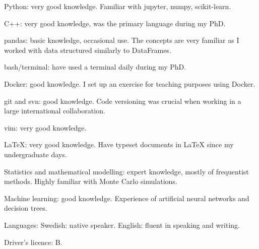 



\begin{cvskills}


\cvskill
{Python:}
{very good knowledge. Familiar with jupyter, numpy, scikit-learn.}

\cvskill
{C++:}
{very good knowledge, was the primary language during my PhD.}

\cvskill
{pandas:}
{basic knowledge, occasional use. The concepts are very familiar as I worked with data structured \newline similarly to DataFrames.}

\cvskill
{bash/terminal:}
{have used a terminal daily during my PhD.}

\cvskill
{Docker:} 
{good knowledge. I set up an exercise for teaching purposes using Docker.}

\cvskill
{git and svn:}
{good knowledge. Code versioning was crucial when working in a large international collaboration.}

\cvskill
{vim:}
{very good knowledge.}

\cvskill
{LaTeX:}
{very good knowledge. Have typeset documents in LaTeX since my undergraduate days.}

\cvskill
{Statistics and}{}
\cvskill
{mathematical modelling:} 
{expert knowledge, mostly of frequentist methods. Highly familiar with Monte Carlo simulations.}


\cvskill
{Machine learning:}
{good knowledge. Experience of artificial neural networks and decision trees.}

\cvskill
{Languages:}
{Swedish: native speaker. English: fluent in speaking and writing.}

\cvskill
{Driver's licence:}
{B.}


\end{cvskills}